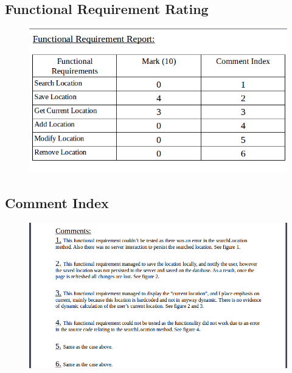 \documentclass[english]{article}
\begin{document}
\subsection{Functional Requirement Rating}
\begin{figure}[ht!]
\hspace*{-2.5cm}
\includegraphics[width=180cm]{mark-tbl-poi.png}
\end{figure}
\subsection{Comment Index}
\begin{figure}[ht!]
\hspace*{-2.5cm}
\includegraphics[width=180cm]{comments-poi.png}
\end{figure}
\end{document}
